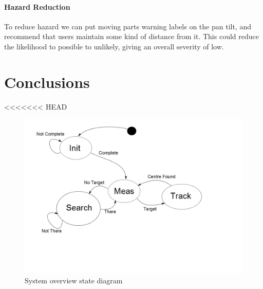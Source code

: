 \documentclass[]{report}
\begin{document}
\subsubsection{Hazard Reduction}
To reduce hazard we can put moving parts warning labels on the pan tilt, and recommend that users maintain some kind of distance from it. This could reduce the likelihood to possible to unlikely, giving an overall severity of low.

\chapter{Conclusions}


<<<<<<< HEAD
\begin{figure}
\centering
\includegraphics[width=0.7\linewidth]{"../Diagrams/Operation State Transition Diagram"}
\caption[State Diagram]{System overview state diagram}
\label{fig:OperationStateTransitionDiagram}
\end{figure}
\end{document}
